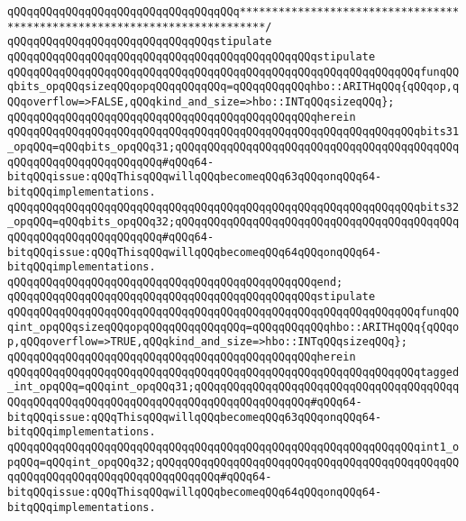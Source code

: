 \verb|qQQqqQQqqQQqqQQqqQQqqQQqqQQqqQQqqQQq**************************************************************************/|\newline
\newline
\verb|qQQqqQQqqQQqqQQqqQQqqQQqqQQqqQQqstipulate|\newline
\newline
\verb|qQQqqQQqqQQqqQQqqQQqqQQqqQQqqQQqqQQqqQQqqQQqqQQqstipulate|\newline
\verb|qQQqqQQqqQQqqQQqqQQqqQQqqQQqqQQqqQQqqQQqqQQqqQQqqQQqqQQqqQQqqQQqfunqQQqbits_opqQQqsizeqQQqopqQQqqQQqqQQq=qQQqqQQqqQQqhbo::ARITHqQQq{qQQqop,qQQqoverflow=>FALSE,qQQqkind_and_size=>hbo::INTqQQqsizeqQQq};|\newline
\verb|qQQqqQQqqQQqqQQqqQQqqQQqqQQqqQQqqQQqqQQqqQQqqQQqherein|\newline
\verb|qQQqqQQqqQQqqQQqqQQqqQQqqQQqqQQqqQQqqQQqqQQqqQQqqQQqqQQqqQQqqQQqbits31_opqQQq=qQQqbits_opqQQq31;qQQqqQQqqQQqqQQqqQQqqQQqqQQqqQQqqQQqqQQqqQQqqQQqqQQqqQQqqQQqqQQqqQQq#qQQq64-bitqQQqissue:qQQqThisqQQqwillqQQqbecomeqQQq63qQQqonqQQq64-bitqQQqimplementations.|\newline
\verb|qQQqqQQqqQQqqQQqqQQqqQQqqQQqqQQqqQQqqQQqqQQqqQQqqQQqqQQqqQQqqQQqbits32_opqQQq=qQQqbits_opqQQq32;qQQqqQQqqQQqqQQqqQQqqQQqqQQqqQQqqQQqqQQqqQQqqQQqqQQqqQQqqQQqqQQqqQQq#qQQq64-bitqQQqissue:qQQqThisqQQqwillqQQqbecomeqQQq64qQQqonqQQq64-bitqQQqimplementations.|\newline
\verb|qQQqqQQqqQQqqQQqqQQqqQQqqQQqqQQqqQQqqQQqqQQqqQQqend;|\newline
\newline
\verb|qQQqqQQqqQQqqQQqqQQqqQQqqQQqqQQqqQQqqQQqqQQqqQQqstipulate|\newline
\verb|qQQqqQQqqQQqqQQqqQQqqQQqqQQqqQQqqQQqqQQqqQQqqQQqqQQqqQQqqQQqqQQqfunqQQqint_opqQQqsizeqQQqopqQQqqQQqqQQqqQQq=qQQqqQQqqQQqhbo::ARITHqQQq{qQQqop,qQQqoverflow=>TRUE,qQQqkind_and_size=>hbo::INTqQQqsizeqQQq};|\newline
\verb|qQQqqQQqqQQqqQQqqQQqqQQqqQQqqQQqqQQqqQQqqQQqqQQqherein|\newline
\verb|qQQqqQQqqQQqqQQqqQQqqQQqqQQqqQQqqQQqqQQqqQQqqQQqqQQqqQQqqQQqqQQqtagged_int_opqQQq=qQQqint_opqQQq31;qQQqqQQqqQQqqQQqqQQqqQQqqQQqqQQqqQQqqQQqqQQqqQQqqQQqqQQqqQQqqQQqqQQqqQQqqQQqqQQqqQQqqQQq#qQQq64-bitqQQqissue:qQQqThisqQQqwillqQQqbecomeqQQq63qQQqonqQQq64-bitqQQqimplementations.|\newline
\verb|qQQqqQQqqQQqqQQqqQQqqQQqqQQqqQQqqQQqqQQqqQQqqQQqqQQqqQQqqQQqqQQqint1_opqQQq=qQQqint_opqQQq32;qQQqqQQqqQQqqQQqqQQqqQQqqQQqqQQqqQQqqQQqqQQqqQQqqQQqqQQqqQQqqQQqqQQqqQQqqQQqqQQq#qQQq64-bitqQQqissue:qQQqThisqQQqwillqQQqbecomeqQQq64qQQqonqQQq64-bitqQQqimplementations.|\newline
